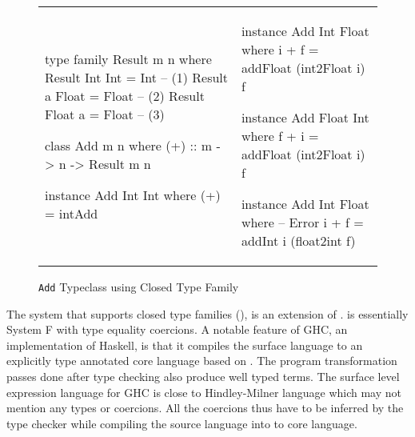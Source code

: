 \documentclass[format=sigplan,manuscript,review,screen,nonacm,margin=1in]{acmart}
\begin{document}
\begin{figure}[ht]
  \begin{tabular}{l l}
\begin{code}
type family Result m n where
  Result Int Int = Int   -- (1)
  Result a Float = Float -- (2)
  Result Float a = Float -- (3)

class Add m n where
  (+) :: m -> n -> Result m n

instance Add Int Int where
  (+) = intAdd
\end{code}&%
\begin{code}
instance Add Int Float where
  i + f = addFloat (int2Float i) f

instance Add Float Int where
  f + i = addFloat (int2Float i) f

instance Add Int Float where -- Error
  i + f = addInt i (float2int f)
    \end{code}
  \end{tabular}
  \caption{\texttt{Add} Typeclass using Closed Type Family}
  \label{fig:add-ty-fam}
\end{figure}
The system that supports closed type families (\CLTF{}), is an extension of \FC\cite{sulzmann_system_2007}.
\FC is essentially System F\cite{girard_proofs_1989,reynolds_towards_1974} with type equality coercions.
A notable feature of GHC, an implementation of Haskell, is that it compiles the surface language
to an explicitly type annotated core language based on \FC. The program transformation
passes done after type checking also produce well typed \FC terms. The surface level expression
language for GHC is close to Hindley-Milner language which may not mention any types or coercions.
All the coercions thus have to be inferred by the type checker while compiling
the source language into to core language. 
\end{document}
